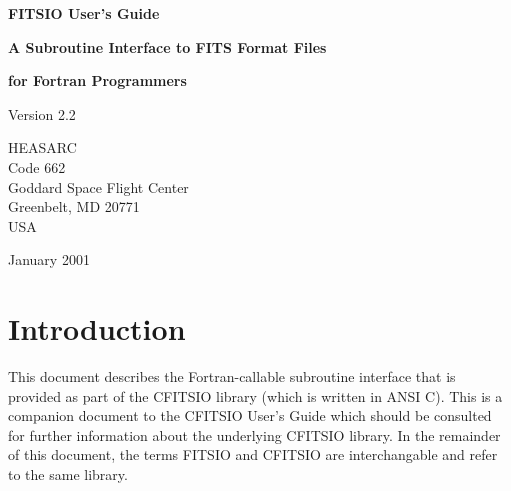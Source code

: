 \documentclass[11pt]{book}
\begin{document}

\begin{titlepage}
\normalsize
\vspace*{4.6cm}
\begin{center}
{\Huge \bf FITSIO User's Guide}\\
\end{center}
\medskip 
\medskip
\begin{center}
{\LARGE \bf A Subroutine Interface to FITS Format Files}\\
\end{center}
\begin{center}
{\LARGE \bf for Fortran Programmers}\\
\end{center}
\medskip
\medskip
\begin{center}
{\Large Version 2.2\\}
\end{center}
\bigskip
\vskip 2.5cm
\begin{center}
{HEASARC\\
Code 662\\
Goddard Space Flight Center\\
Greenbelt, MD 20771\\
USA}
\end{center}

\vfill
\bigskip
\begin{center}
{\Large January 2001\\}
\end{center}
\vfill
\end{titlepage}

\clearpage

\tableofcontents

\chapter{Introduction }

This document describes the Fortran-callable subroutine interface that
is provided as part of the CFITSIO library (which is written in ANSI
C).  This is a companion document to the CFITSIO User's Guide which
should be consulted for further information about the underlying
CFITSIO library.  In the remainder of this document, the terms FITSIO
and CFITSIO are interchangable and refer to the same library.
\end{document}
